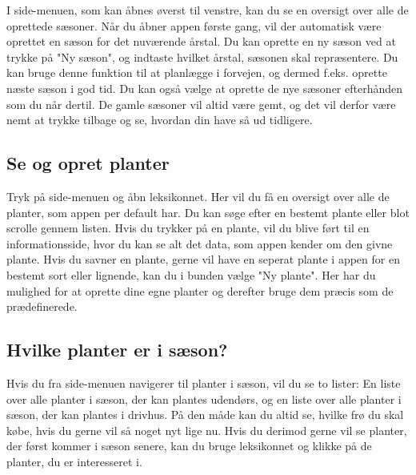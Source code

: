 \begin{minipage}{0.55\textwidth}
I side-menuen, som kan åbnes øverst til venstre, kan du se en oversigt over alle de oprettede sæsoner. Når du åbner appen første gang, vil der automatisk være oprettet en sæson for det nuværende årstal. Du kan oprette en ny sæson ved at trykke på "Ny sæson", og indtaste hvilket årstal, sæsonen skal repræsentere. Du kan bruge denne funktion til at planlægge i forvejen, og dermed f.eks. oprette næste sæson i god tid. Du kan også vælge at oprette de nye sæsoner efterhånden som du når dertil. De gamle sæsoner vil altid være gemt, og det vil derfor være nemt at trykke tilbage og se, hvordan din have så ud tidligere.
\end{minipage} 

\subsection{Se og opret planter}
Tryk på side-menuen og åbn leksikonnet. Her vil du få en oversigt over alle de planter, som appen per default har. Du kan søge efter en bestemt plante eller blot scrolle gennem listen. Hvis du trykker på en plante, vil du blive ført til en informationsside, hvor du kan se alt det data, som appen kender om den givne plante. Hvis du savner en plante, gerne vil have en seperat plante i appen for en bestemt sort eller lignende, kan du i bunden vælge "Ny plante". Her har du mulighed for at oprette dine egne planter og derefter bruge dem præcis som de prædefinerede.

\subsection{Hvilke planter er i sæson?}
Hvis du fra side-menuen navigerer til planter i sæson, vil du se to lister: En liste over alle planter i sæson, der kan plantes udendørs, og en liste over alle planter i sæson, der kan plantes i drivhus. På den måde kan du altid se, hvilke frø du skal købe, hvis du gerne vil så noget nyt lige nu. 
Hvis du derimod gerne vil se planter, der først kommer i sæson senere, kan du bruge leksikonnet og klikke på de planter, du er interesseret i.


